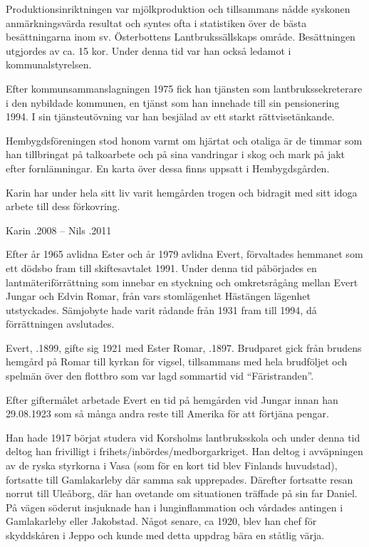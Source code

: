 Produktionsinriktningen var mjölkproduktion och tillsammans nådde syskonen anmärkningsvärda resultat och syntes ofta i statistiken över de bästa besättningarna inom sv. Österbottens Lantbrukssällskaps område. Besättningen utgjordes av ca. 15 kor. Under denna tid var han också ledamot i kommunalstyrelsen.

Efter kommunsammanslagningen 1975 fick han tjänsten som lantbrukssekreterare i den nybildade kommunen, en tjänst som han innehade till sin pensionering 1994. I sin tjänsteutövning var han besjälad av ett starkt rättvisetänkande.

Hembygdsföreningen stod honom varmt om hjärtat och otaliga är de timmar som han tillbringat på talkoarbete och på sina vandringar i skog och mark på jakt efter fornlämningar. En karta över dessa finns uppsatt i Hembygdsgården.

Karin har under hela sitt liv varit hemgården trogen och bidragit med sitt idoga arbete till dess förkovring.

Karin .2008  --  Nils .2011


Efter år 1965 avlidna Ester och år 1979 avlidna Evert, förvaltades hemmanet som ett dödsbo fram till skiftesavtalet 1991. Under denna tid påbörjades en lantmäteriförrättning som innebar en styckning och omkretsrågång mellan Evert Jungar och Edvin Romar, från vars stomlägenhet Hästängen lägenhet utstyckades. Sämjobyte hade varit rådande från 1931 fram till 1994, då förrättningen avslutades.


Evert, .1899, gifte sig 1921 med Ester Romar, .1897. Brudparet gick från brudens hemgård på Romar till kyrkan för vigsel, tillsammans med hela brudföljet och spelmän över den flottbro som var lagd sommartid vid ``Färistranden''.



Efter giftermålet arbetade Evert en tid på hemgården vid Jungar innan han 29.08.1923 som så många andra reste till Amerika för att förtjäna pengar.

Han hade 1917 börjat studera vid Korsholms lantbruksskola och under denna tid deltog han frivilligt i frihets/inbördes/medborgarkriget. Han deltog i avväpningen av de ryska styrkorna i Vasa (som för en kort tid blev Finlands huvudstad), fortsatte till Gamlakarleby där samma sak upprepades. Därefter fortsatte resan norrut till Uleåborg, där han ovetande om situationen träffade på sin far Daniel. På vägen söderut insjuknade han i lunginflammation och vårdades antingen i Gamlakarleby eller Jakobstad. Något senare, ca 1920, blev han chef för skyddskåren i Jeppo och kunde med detta uppdrag bära en ståtlig värja.

